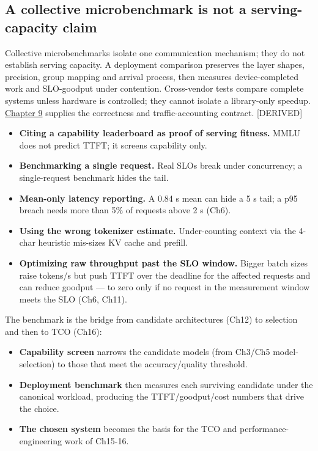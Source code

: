 \subsection{A collective microbenchmark is not a serving-capacity
claim}\label{a-collective-microbenchmark-is-not-a-serving-capacity-claim}

Collective microbenchmarks isolate one communication mechanism; they do
not establish serving capacity. A deployment comparison preserves the
layer shapes, precision, group mapping and arrival process, then
measures device-completed work and SLO-goodput under contention.
Cross-vendor tests compare complete systems unless hardware is
controlled; they cannot isolate a library-only speedup. \hyperref[chap:9]{Chapter 9}
supplies the correctness and traffic-accounting contract. \mbox{{[}DERIVED{]}}

\label{common-mistakes}


\begin{itemize}
\tightlist
\item
  \textbf{Citing a capability leaderboard as proof of serving fitness.}
  MMLU does not predict TTFT; it screens capability only.
\item
  \textbf{Benchmarking a single request.} Real SLOs break under
  concurrency; a single-request benchmark hides the tail.
\item
  \textbf{Mean-only latency reporting.} A 0.84 s mean can hide a 5 s
  tail; a p95 breach needs more than 5\% of requests above 2 s (Ch6).
\item
  \textbf{Using the wrong tokenizer estimate.} Under-counting context
  via the 4-char heuristic mis-sizes KV cache and prefill.
\item
  \textbf{Optimizing raw throughput past the SLO window.} Bigger batch
  sizes raise tokens/s but push TTFT over the deadline for the affected
  requests and can reduce goodput --- to zero only if no request in the
  measurement window meets the SLO (Ch6, Ch11).
\end{itemize}

\label{architecture-consequence}


The benchmark is the bridge from candidate architectures (Ch12) to
selection and then to TCO (Ch16):

\begin{itemize}
\tightlist
\item
  \textbf{Capability screen} narrows the candidate models (from Ch3/Ch5
  model-selection) to those that meet the accuracy/quality threshold.
\item
  \textbf{Deployment benchmark} then measures each surviving candidate
  under the canonical workload, producing the TTFT/goodput/cost numbers
  that drive the choice.
\item
  \textbf{The chosen system} becomes the basis for the TCO and
  performance-engineering work of Ch15-16.
\end{itemize}


